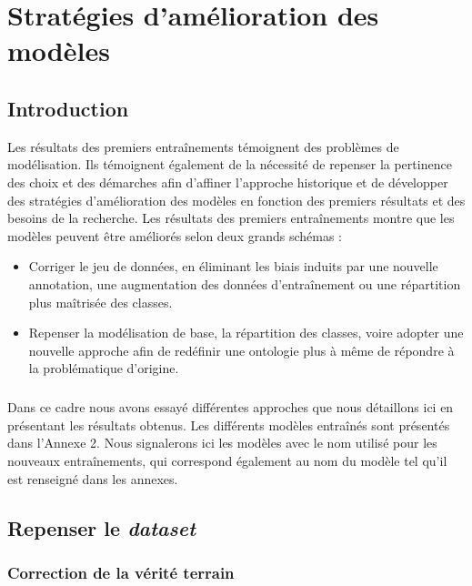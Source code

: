 \documentclass[12pt,twoside]{book}
\begin{document}
\chapter{Stratégies d’amélioration des modèles}

\section{Introduction}

Les résultats des premiers entraînements témoignent des problèmes de modélisation. Ils témoignent également de la nécessité de repenser la pertinence des choix et des démarches afin d’affiner l’approche historique et de développer des stratégies d’amélioration des modèles en fonction des premiers résultats et des besoins de la recherche. Les résultats des premiers entraînements montre que les modèles peuvent être améliorés selon deux grands schémas :

\begin{itemize}
    \item Corriger le jeu de données, en éliminant les biais induits par une nouvelle annotation, une augmentation des données d’entraînement ou une répartition plus maîtrisée des classes.
    \item Repenser la modélisation de base, la répartition des classes, voire adopter une nouvelle approche afin de redéfinir une ontologie plus à même de répondre à la problématique d’origine. 
\end{itemize}

\paragraph{}Dans ce cadre nous avons essayé différentes approches que nous détaillons ici en présentant les résultats obtenus. Les différents modèles entraînés sont présentés dans l’Annexe 2. Nous signalerons ici les modèles avec le nom utilisé pour les nouveaux entraînements, qui correspond également au nom du modèle tel qu’il est renseigné dans les annexes. 

\newpage
\section{Repenser le \textit{dataset}}
\subsection{Correction de la vérité terrain}
\end{document}
